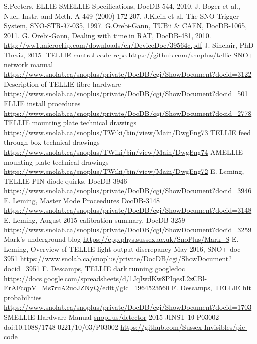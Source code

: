\documentclass[12pt]{report}
\begin{document}
\begin{thebibliography}{99}

	 S.Peeters, ELLIE SMELLIE Specifications, DocDB-544, 2010.
	 J. Boger et al., Nucl. Instr. and Meth. A 449 (2000) 172-207.	
	 J.Klein et al, The SNO Trigger System, SNO-STR-97-035, 1997.
	 G.Orebi-Gann, TUBii \& CAEN, DocDB-1065, 2011.
	 G. Orebi-Gann, Dealing with time in RAT, DocDB-481, 2010.
	 \url{http://ww1.microchip.com/downloads/en/DeviceDoc/39564c.pdf}
	 J. Sinclair, PhD Thesis, 2015.
	 TELLIE control code repo \url{https://github.com/snoplus/tellie}
	 SNO+ network manual \url{https://www.snolab.ca/snoplus/private/DocDB/cgi/ShowDocument?docid=3122}
	 Description of TELLIE fibre hardware \url{https://www.snolab.ca/snoplus/private/DocDB/cgi/ShowDocument?docid=501}
	 ELLIE install procedures \url{https://www.snolab.ca/snoplus/private/DocDB/cgi/ShowDocument?docid=2778}
	 TELLIE mounting plate technical drawings \url{https://www.snolab.ca/snoplus/TWiki/bin/view/Main/DwgEng73}
	 TELLIE feed through box technical drawings \url{https://www.snolab.ca/snoplus/TWiki/bin/view/Main/DwgEng74}
	 AMELLIE mounting plate technical drawings \url{https://www.snolab.ca/snoplus/TWiki/bin/view/Main/DwgEng72}
	 E. Leming, TELLIE PIN diode quirks, DocDB-3946 			\url{https://www.snolab.ca/snoplus/private/DocDB/cgi/ShowDocument?docid=3946}
	 E. Leming, Master Mode Proceedures DocDB-3148 \url{https://www.snolab.ca/snoplus/private/DocDB/cgi/ShowDocument?docid=3148}
	 E. Leming, August 2015 calibration summary, DocDB-3259
	\url{https://www.snolab.ca/snoplus/private/DocDB/cgi/ShowDocument?docid=3259}
	 Mark's underground blog \url{https://epp.phys.sussex.ac.uk/SnoPlus/Mark--S}
	 E. Leming, Overview of TELLIE light output discrepancy May 2016, SNO+-doc-3951 \url{https://www.snolab.ca/snoplus/private/DocDB/cgi/ShowDocument?docid=3951}
	 F. Descamps, TELLIE dark running googledoc \url{https://docs.google.com/spreadsheets/d/1JqIwdKw8PIqesL2zCBl-ErAFcqpV_Ms7ruA2uoJZNyQ/edit#gid=1964523560}
	 F. Descamps, TELLIE hit probabilities \url{https://www.snolab.ca/snoplus/private/DocDB/cgi/ShowDocument?docid=1703}
	 SMELLIE Hardware Manual \url{snopl.us/detector}
	 2015 JINST 10 P03002 doi:10.1088/1748-0221/10/03/P03002
	 \url{https://github.com/Sussex-Invisibles/pic-code}
\end{thebibliography}

\end{document}
